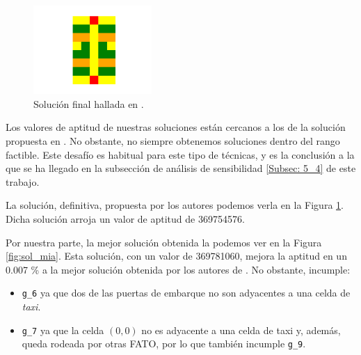\documentclass[12pt,a4paper]{book}
\begin{document}

\begin{figure}
  \begin{center}
    \includegraphics[width=0.4\textwidth]{img/solu_autores.png}
  \end{center}
  \caption{Solución final hallada en \cite{park_vertiport_2022}.}
  \label{fig:sol_autores}
\end{figure}   

Los valores de aptitud de nuestras soluciones están cercanos a los de la solución propuesta en \cite{park_vertiport_2022}. No obstante, no siempre obtenemos soluciones dentro del rango factible. Este desafío es habitual para este tipo de técnicas, y es la conclusión a la que se ha llegado en la subsección de análisis de sensibilidad \ref{Subsec: 5_4} de este trabajo. 

La solución, definitiva, propuesta por los autores podemos verla en la Figura \ref{fig:sol_autores}. Dicha solución arroja un valor de aptitud de 369754576. 



Por nuestra parte, la mejor solución obtenida la podemos ver en la Figura \ref{fig:sol_mia}. Esta solución, con un valor de 369781060, mejora la aptitud en un 0.007 \% a la mejor solución obtenida por los autores de \cite{park_vertiport_2022}. No obstante, incumple: 
\begin{itemize}
	\item \texttt{g\_6} ya que dos de las puertas de embarque no son adyacentes a una celda de \textsl{taxi}.
	\item  \texttt{g\_7} ya que la celda $(0,0)$ no es adyacente a una celda de taxi y, además, queda rodeada por otras FATO, por lo que también incumple \texttt{g\_9}. 
\end{itemize}
\end{document}
